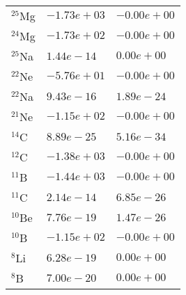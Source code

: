 \begin{tabular}{lll}
 $^{25}$Mg & $-1.73e+03 $                                                       & $-0.00e+00 $                                                          \\
 $^{24}$Mg & $-1.73e+02 $                                                       & $-0.00e+00 $                                                          \\
 $^{25}$Na & $1.44e-14 $                                                        & $0.00e+00 $                                                           \\
 $^{22}$Ne & $-5.76e+01 $                                                       & $-0.00e+00 $                                                          \\
 $^{22}$Na & $9.43e-16 $                                                        & $1.89e-24 $                                                           \\
 $^{21}$Ne & $-1.15e+02 $                                                       & $-0.00e+00 $                                                          \\
 $^{14}$C  & $8.89e-25 $                                                        & $5.16e-34 $                                                           \\
 $^{12}$C  & $-1.38e+03 $                                                       & $-0.00e+00 $                                                          \\
 $^{11}$B  & $-1.44e+03 $                                                       & $-0.00e+00 $                                                          \\
 $^{11}$C  & $2.14e-14 $                                                        & $6.85e-26 $                                                           \\
 $^{10}$Be & $7.76e-19 $                                                        & $1.47e-26 $                                                           \\
 $^{10}$B  & $-1.15e+02 $                                                       & $-0.00e+00 $                                                          \\
 $^{8}$Li  & $6.28e-19 $                                                        & $0.00e+00 $                                                           \\
 $^{8}$B   & $7.00e-20 $                                                        & $0.00e+00 $                                                           \\

\end{tabular}
